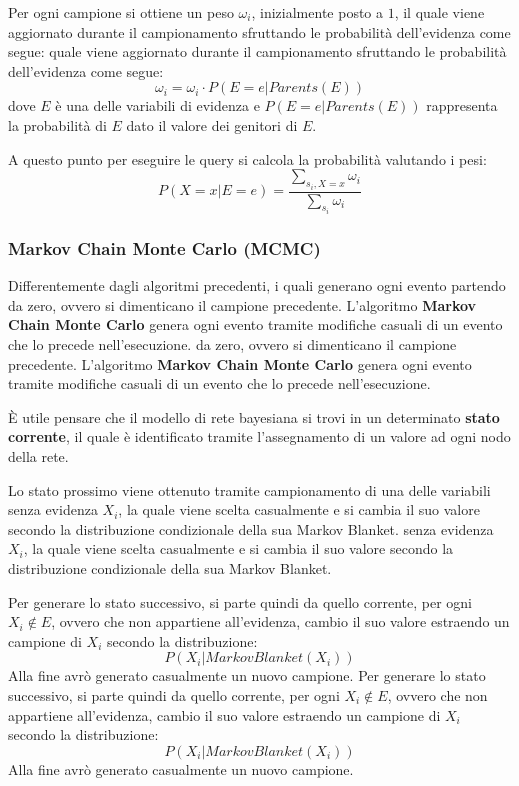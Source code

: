 Per ogni campione si ottiene un peso $\omega_i$, inizialmente posto a $1$, il
quale viene aggiornato durante il campionamento sfruttando le probabilità
dell'evidenza come segue:
quale viene aggiornato durante il campionamento sfruttando le probabilità
dell'evidenza come segue:
\begin{equation*}
    \omega_i = \omega_i \cdot P(E = e | Parents(E))
\end{equation*}
dove $E$ è una delle variabili di evidenza e $P(E=e | Parents(E))$ rappresenta la
probabilità di $E$ dato il valore dei genitori di $E$.

A questo punto per eseguire le query si calcola la probabilità valutando i pesi:
\begin{equation*}
    P(X = x | E = e) = \frac{\sum_{s_i, X=x} \omega_i}{\sum_{s_i} \omega_i}
\end{equation*}
\subsubsection{Markov Chain Monte Carlo (MCMC)}
Differentemente dagli algoritmi precedenti, i quali generano ogni evento partendo
da zero, ovvero si dimenticano il campione precedente. L'algoritmo \textbf{Markov
    Chain Monte Carlo} genera ogni evento tramite modifiche casuali di un evento
che lo precede nell'esecuzione.
da zero, ovvero si dimenticano il campione precedente. L'algoritmo \textbf{Markov
    Chain Monte Carlo} genera ogni evento tramite modifiche casuali di un evento
che lo precede nell'esecuzione.

È utile pensare che il modello di rete bayesiana si trovi in un determinato
\textbf{stato corrente}, il quale è identificato tramite l'assegnamento di un
valore ad ogni nodo della rete.

Lo stato prossimo viene ottenuto tramite campionamento di una delle variabili
senza evidenza $X_i$, la quale viene scelta casualmente e si cambia il suo
valore secondo la distribuzione condizionale della sua Markov Blanket.
senza evidenza $X_i$, la quale viene scelta casualmente e si cambia il suo
valore secondo la distribuzione condizionale della sua Markov Blanket.

Per generare lo stato successivo, si parte quindi da quello corrente, per ogni
$X_i \not \in E$, ovvero che non appartiene all'evidenza, cambio il suo valore
estraendo un campione di $X_i$ secondo la distribuzione:
\begin{equation*}
    P(X_i | MarkovBlanket(X_i))
\end{equation*}
Alla fine avrò generato casualmente un nuovo campione.
Per generare lo stato successivo, si parte quindi da quello corrente, per ogni
$X_i \not \in E$, ovvero che non appartiene all'evidenza, cambio il suo valore
estraendo un campione di $X_i$ secondo la distribuzione:
\begin{equation*}
    P(X_i | MarkovBlanket(X_i))
\end{equation*}
Alla fine avrò generato casualmente un nuovo campione.

